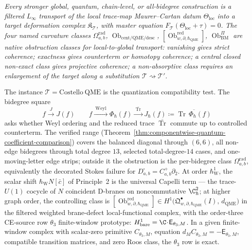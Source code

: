 \emph{Every stronger global, quantum, chain-level, or all-bidegree
construction is a filtered \(L_\infty\) transport of the local
trace-map Maurer--Cartan datum \(\Theta_{\mathrm{loc}}\) into
a target deformation complex \(\mathfrak K_{\mathcal T}\), with master
equation \(F_{\mathcal T}(\Theta_{\mathrm{loc}}+\tau)=0\).  The four
named curvature classes
\(\Omega^{\mathrm{rad}}_{a,b}\),
\(\operatorname{Ob}_{\mathrm{cent/QME/desc}}\),
\([\operatorname{Ob}^{\mathrm{red}}_{w,\partial,\hbar_{\mathrm{QME}}}]\),
\(\operatorname{Ob}^{\Pi}_{\mathrm{BM}}\)
are native obstruction classes for local-to-global transport:
vanishing gives strict coherence; exactness gives counterterm or
homotopy coherence; a central closed non-exact class gives projective
coherence; a non-absorptive class requires an enlargement of the target
along a substitution \(\mathcal T\rightsquigarrow\mathcal T'\).}

The instance \(\mathcal T=\mathrm{Costello\ QME}\) is the
quantization compatibility test.  The bidegree square
\[
  f\xrightarrow{\;J\;}J(f)\qquad
  f\xrightarrow{\;\mathrm{Weyl}\;}\Phi_\hbar(f)
   \xrightarrow{\;\overline{\operatorname{Tr}}\;}
   J_\hbar(f)\coloneq\overline{\operatorname{Tr}\,\Phi_\hbar(f)}
\]
asks whether Weyl ordering and the reduced trace
\(\overline{\operatorname{Tr}}\) commute up to controlled
counterterm.  The verified range
(Theorem~\ref{thm:componentwise-quantum-coefficient-comparison})
covers the balanced diagonal through \((6,6)\), all non-edge
bidegrees through total degree \(13\), selected total-degree-\(14\)
cases, and one-moving-letter edge strips; outside it the obstruction
is the per-bidegree class \(\Omega^{\mathrm{rad}}_{a,b}\),
equivalently the decorated Stokes failure for
\(D^\square_{a,b}=C^+_{a,b}\partial_2\).  At order
\(\hbar_{\mathrm{W}}^1\), the scalar shift
\(\hbar_{\mathrm{W}}N[\bar c]\) of Principle~2 is the universal
Capelli term --- the trace-\(U(1)\) cocycle of \(N\) coincident
D-branes on noncommutative \(\C^2_\hbar\); at higher graph order, the
controlling class is
\([\operatorname{Ob}^{\mathrm{red}}_{w,\partial,\hbar_{\mathrm{QME}}}]\in
H^1\bigl(\mathfrak Q^\bullet_{w,\partial,\hbar_{\mathrm{QME}}}(I),\,d_{\mathrm{QME}}\bigr)\)
in the filtered weighted brane-defect local-functional complex,
with the order-three CE-source row \(\theta_3\) finite-window
prototype:
\(H^1_{\mathrm{bare}}=\C\!\cdot\!\mathsf E_{\theta_3,M}\).  In a
given finite-window complex with scalar-zero primitive
\(C_{\theta_3,M}\), equation
\(d_M C_{\theta_3,M}=-\mathsf E_{\theta_3,M}\), compatible transition
matrices, and zero Roos class, the \(\theta_3\) row is exact.

